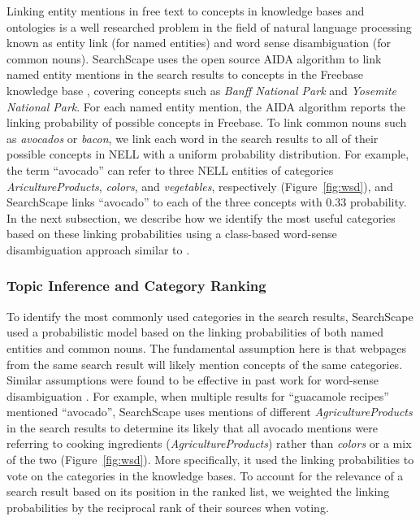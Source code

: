 Linking entity mentions in free text to concepts in knowledge bases and ontologies is a well researched problem in the field of natural language processing known as entity link (for named entities) and word sense disambiguation (for common nouns). SearchScape uses the open source AIDA algorithm to link named entity mentions in the search results to concepts in the Freebase knowledge base \cite{yosef2011aida,bollacker2008freebase}, covering concepts such as \emph{Banff National Park} and \emph{Yosemite National Park}.
For each named entity mention, the AIDA algorithm reports the linking probability of possible concepts in Freebase.
To link common nouns such as \emph{avocados} or \emph{bacon}, we link each word in the search results to all of their possible concepts in NELL with a uniform probability distribution.
For example, the term ``avocado'' can refer to three NELL\cite{carlson2010toward} entities of categories \emph{AricultureProducts}, \emph{colors}, and \emph{vegetables}, respectively (Figure~\ref{fig:wsd}), and SearchScape links ``avocado'' to each of the three concepts with 0.33 probability.
In the next subsection, we describe how we identify the most useful categories based on these linking probabilities using a class-based word-sense disambiguation approach similar to \cite{yarowsky1995unsupervised,chang2009wikisense}.



\subsubsection{Topic Inference and Category Ranking}

To identify the most commonly used categories in the search results, SearchScape used a probabilistic model based on the linking probabilities of both named entities and common nouns. The fundamental assumption here is that webpages from the same search result will likely mention concepts of the same categories.
Similar assumptions were found to be effective in past work for word-sense disambiguation \cite{yarowsky1995unsupervised}.
For example, when multiple results for ``guacamole recipes'' mentioned ``avocado'', 
SearchScape uses mentions of different \emph{AgricultureProducts} in the search results to determine
its likely that all avocado mentions were referring to cooking ingredients (\emph{AgricultureProducts}) rather than \emph{colors} or a mix of the two (Figure~\ref{fig:wsd}).
More specifically, it used the linking probabilities to vote on the categories in the knowledge bases. To account for the relevance of a search result based on its position in the ranked list, we weighted the linking probabilities by the reciprocal rank of their sources when voting.

